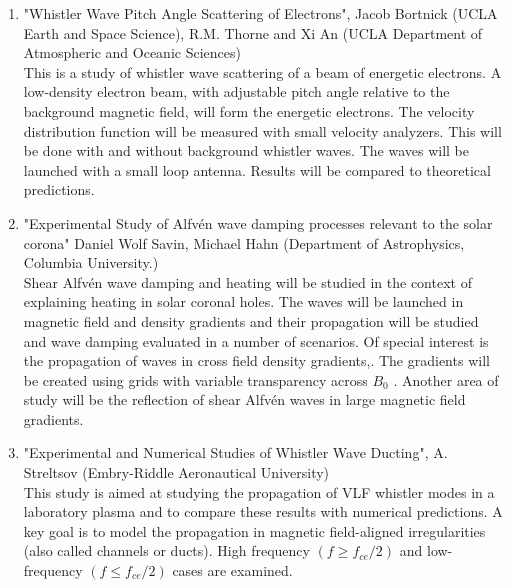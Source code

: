 \documentclass[11pt]{article}
\begin{document}
\begin{enumerate}
\item "Whistler Wave Pitch Angle Scattering of Electrons", Jacob Bortnick (UCLA Earth and Space Science), R.M. Thorne and Xi An (UCLA Department of Atmospheric and Oceanic Sciences)\\
This is a study of whistler wave scattering of a beam of energetic electrons. A low-density electron beam, with adjustable pitch angle relative to the background magnetic field, will form the energetic electrons. The velocity distribution function will be measured with small velocity analyzers. This will be done with and without background whistler waves. The waves will be launched with a small loop antenna. Results will be compared to theoretical predictions.

\item "Experimental Study of Alfv\'{e}n wave damping processes relevant to the solar corona"  Daniel Wolf Savin, Michael Hahn (Department of Astrophysics, Columbia University.) \\
Shear Alfv\'{e}n wave damping and heating will be studied in the context of explaining heating in solar coronal holes. The waves will be launched in magnetic field and density gradients and their propagation will be studied and wave damping evaluated in a number of scenarios. Of special interest is the propagation of waves in cross field density gradients,. The gradients will be created using grids with variable transparency across $B_{0}$ . Another area of study will be the reflection of shear Alfv\'{e}n waves in large magnetic field gradients.

\item "Experimental and Numerical Studies of Whistler Wave Ducting", A. Streltsov (Embry-Riddle Aeronautical University)\\
This study is aimed at studying the propagation of VLF whistler modes in a laboratory plasma and to compare these results with numerical predictions. A key goal is to model the propagation in magnetic field-aligned irregularities (also called channels or ducts). High frequency $(f  \ge f_{ce}/2)$ and low-frequency $(f \le f_{ce}/2)$ cases are examined.



\end{enumerate}
\end{document}
